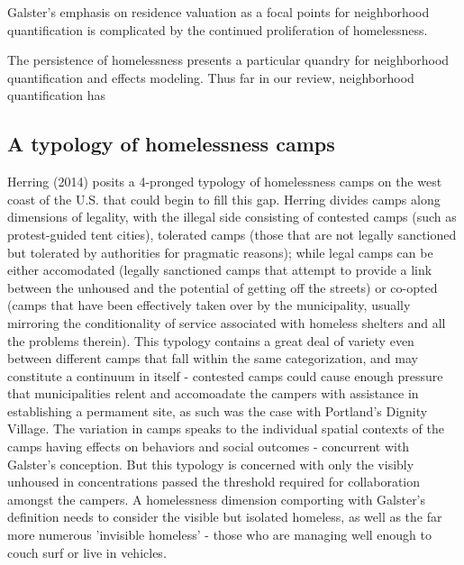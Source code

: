 Galster's emphasis on residence valuation as a focal points for
neighborhood quantification is complicated by the continued
proliferation of homelessness.

The persistence of homelessness presents a particular quandry for
neighborhood quantification and effects modeling. Thus far in our
review, neighborhood quantification has

\subsection{A typology of homelessness camps}
Herring (2014) posits a 4-pronged typology of homelessness camps on
the west coast of the U.S. that could begin to fill this gap. Herring
divides camps along dimensions of legality, with the illegal side
consisting of contested camps (such as protest-guided tent cities),
tolerated camps (those that are not legally sanctioned but tolerated
by authorities for pragmatic reasons); while legal camps can be either
accomodated (legally sanctioned camps that attempt to provide a link
between the unhoused and the potential of getting off the streets) or
co-opted (camps that have been effectively taken over by the
municipality, usually mirroring the conditionality of service
associated with homeless shelters and all the problems therein). This
typology contains a great deal of variety even between different camps
that fall within the same categorization, and may constitute a
continuum in itself - contested camps could cause enough pressure that
municipalities relent and accomoadate the campers with assistance in
establishing a permament site, as such was the case with Portland's
Dignity Village. The variation in camps speaks to the individual
spatial contexts of the camps having effects on behaviors and social
outcomes - concurrent with Galster's conception. But this typology is
concerned with only the visibly unhoused in concentrations passed the
threshold required for collaboration amongst the campers. A
homelessness dimension comporting with Galster's definition needs to
consider the visible but isolated homeless, as well as the far more
numerous 'invisible homeless' - those who are managing well enough to
couch surf or live in vehicles.

